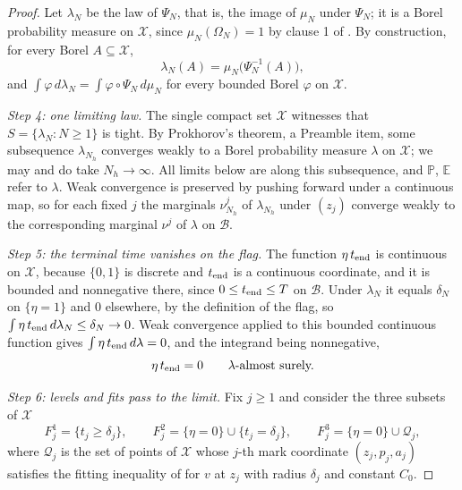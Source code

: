 \begin{proof}
Let $\lambda_N$ be the law of $\Psi_N$, that is, the image of $\mu_N$ under
$\Psi_N$; it is a Borel probability measure on $\mathcal X$, since
$\mu_N(\Omega_N)=1$ by clause 1 of . By construction, for
every Borel $A\subseteq\mathcal X$,
\begin{equation}\label{eq:cp-pushforward}
  \lambda_N(A)=\mu_N\bigl(\Psi_N^{-1}(A)\bigr),
\end{equation}
and $\int\varphi\,d\lambda_N=\int\varphi\circ\Psi_N\,d\mu_N$ for every bounded
Borel $\varphi$ on $\mathcal X$.

\emph{Step 4: one limiting law.}
The single compact set $\mathcal X$ witnesses that
$S=\{\lambda_N:N\ge1\}$ is tight. By Prokhorov's theorem, a Preamble item,
some subsequence $\lambda_{N_h}$ converges weakly to a Borel probability
measure $\lambda$ on $\mathcal X$; we may and do take $N_h\to\infty$. All
limits below are along this subsequence, and $\mathbb P$, $\mathbb E$ refer to
$\lambda$. Weak convergence is preserved by pushing forward under a continuous
map, so for each fixed $j$ the marginals $\nu^j_{N_h}$ of $\lambda_{N_h}$ under
$(z_j)$ converge weakly to the corresponding marginal $\nu^j$ of $\lambda$ on
$\mathcal B$.

\emph{Step 5: the terminal time vanishes on the flag.}
The function $\eta\,t_{\rm end}$ is continuous on $\mathcal X$, because
$\{0,1\}$ is discrete and $t_{\rm end}$ is a continuous coordinate, and it is
bounded and nonnegative there, since $0\le t_{\rm end}\le T$ on $\mathcal B$.
Under $\lambda_N$ it equals $\delta_N$ on $\{\eta=1\}$ and $0$ elsewhere, by the
definition of the flag, so
$\int\eta\,t_{\rm end}\,d\lambda_N\le\delta_N\to0$. Weak convergence applied to
this bounded continuous function gives $\int\eta\,t_{\rm end}\,d\lambda=0$, and
the integrand being nonnegative,
\begin{equation}\label{eq:cp-terminal-time}
  \eta\,t_{\rm end}=0\qquad\lambda\text{-almost surely.}
\end{equation}

\emph{Step 6: levels and fits pass to the limit.}
Fix $j\ge1$ and consider the three subsets of $\mathcal X$
\[
  F^1_j=\{t_j\ge\delta_j\},\qquad
  F^2_j=\{\eta=0\}\cup\{t_j=\delta_j\},\qquad
  F^3_j=\{\eta=0\}\cup\mathcal Q_j,
\]
where $\mathcal Q_j$ is the set of points of $\mathcal X$ whose $j$-th mark
coordinate $(z_j,p_j,a_j)$ satisfies the fitting inequality of
 for $v$ at $z_j$ with radius $\delta_j$ and constant $C_0$.


\end{proof}
